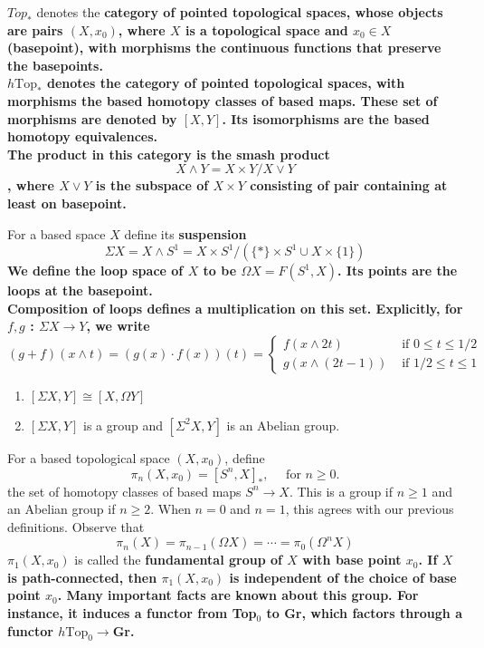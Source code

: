 $Top_*$ denotes the \bf{category of pointed topological spaces}, whose objects are pairs $(X,x_0)$, where $X$ is a topological space and $x_0 \in X$ (\bf{basepoint}), with morphisms the continuous functions that preserve the basepoints.\\
$h \text{Top}_*$ denotes the category of pointed topological spaces, with morphisms the based homotopy classes of based maps. These set of morphisms are denoted by $[X,Y]$. Its isomorphisms are the based homotopy equivalences.\\
The product in this category is the \bf{smash product} $$X \wedge Y=X \times Y / X \vee Y$$, where $X \vee Y$ is the subspace of $X \times Y$ consisting of pair containing at least on basepoint.

For a based space $X$ define its \bf{suspension} $$\Sigma X= X \wedge S^1 = X \times S^1 /\left(\{*\} \times S^1 \cup X \times\{1\}\right)$$
We define the loop space of $X$ to be $\Omega X=F\left(S^1, X\right)$. Its points are the loops at the basepoint.\\
Composition of loops defines a multiplication on this set. Explicitly, for $f, g$ : $\Sigma X \longrightarrow Y$, we write
$$
(g+f)(x \wedge t)=(g(x) \cdot f(x))(t)= \begin{cases}f(x \wedge 2 t) & \text { if } 0 \leq t \leq 1 / 2 \\ g(x \wedge(2 t-1)) & \text { if } 1 / 2 \leq t \leq 1\end{cases}
$$

\begin{lemm}
    \begin{enumerate}
        \item $[\Sigma X, Y] \cong[X, \Omega Y]$
        \item $[\Sigma X, Y]$ is a group and $\left[\Sigma^2 X, Y\right]$ is an Abelian group.
    \end{enumerate}
\end{lemm}

For a based topological space $(X,x_0)$, define $$\pi_n\left(X, x_0\right) = [S^n ,X]_*, \quad \text{ for } n\geq 0.$$
the set of homotopy classes of based maps $S^n \longrightarrow X$. This is a group if $n \geq 1$ and an Abelian group if $n \geq 2$. When $n=0$ and $n=1$, this agrees with our previous definitions. Observe that
$$
\pi_n(X)=\pi_{n-1}(\Omega X)=\cdots=\pi_0\left(\Omega^n X\right)
$$
$\pi_1(X,x_0)$ is called the \bf{fundamental group} of $X$ with base point $x_0$. If $X$ is path-connected, then $\pi_1(X,x_0)$ is independent of the choice of base point $x_0$. Many important facts are known about this group. For instance, it induces a functor from Top$_0$ to Gr, which factors through a functor $h\text{Top}_0 \rightarrow $Gr.

